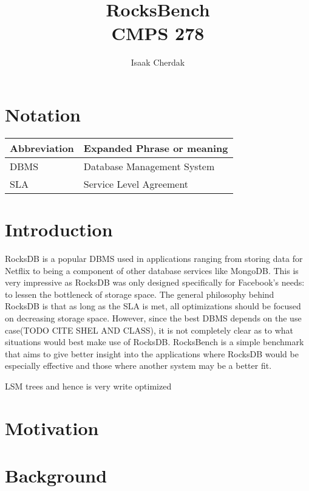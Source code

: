 \documentclass[twocolumn,11pt]{article}
\title{RocksBench\\CMPS 278}
\author{Isaak Cherdak}
\begin{document}
\maketitle

\pagebreak

\section*{Notation}

\begin{center}
  \begin{tabular}{ | l | l | }
    \hline
    Abbreviation & Expanded Phrase or meaning\\ \hline \hline
    DBMS & Database Management System\\ \hline
    SLA & Service Level Agreement\\ \hline
  \end{tabular}
\end{center}

\section{Introduction}
\label{sec:overview}

RocksDB is a popular DBMS used in applications ranging from storing data for
Netflix to being a component of other database services like MongoDB. This is
very impressive as RocksDB was only designed specifically for Facebook's needs:
to lessen the bottleneck of storage space. The general philosophy behind RocksDB
is that as long as the SLA is met, all optimizations should be focused on
decreasing storage space. However, since the best DBMS depends on the use
case(TODO CITE SHEL AND CLASS), it is not completely clear as to what situations
would best make use of RocksDB. RocksBench is a simple benchmark that aims to
give better insight into the applications where RocksDB would be especially
effective and those where another system may be a better fit.


LSM trees and hence is very write optimized

\section{Motivation}


\section{Background}
\label{sec:background}
\end{document}
